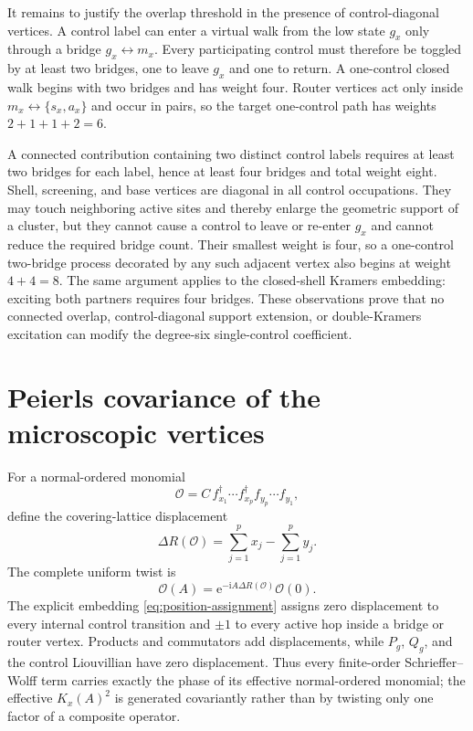 \documentclass[11pt]{article}
\theoremstyle{definition}
\theoremstyle{remark}
\newcommand{\I}{\mathrm i}
\newcommand{\e}{\mathrm e}
\begin{document}
It remains to justify the overlap threshold in the presence of control-diagonal vertices.  A control label can enter a virtual walk from the low state $g_x$ only through a bridge $g_x\leftrightarrow m_x$.  Every participating control must therefore be toggled by at least two bridges, one to leave $g_x$ and one to return.  A one-control closed walk begins with two bridges and has weight four.  Router vertices act only inside $m_x\leftrightarrow\{s_x,a_x\}$ and occur in pairs, so the target one-control path has weights $2+1+1+2=6$.

A connected contribution containing two distinct control labels requires at least two bridges for each label, hence at least four bridges and total weight eight.  Shell, screening, and base vertices are diagonal in all control occupations.  They may touch neighboring active sites and thereby enlarge the geometric support of a cluster, but they cannot cause a control to leave or re-enter $g_x$ and cannot reduce the required bridge count.  Their smallest weight is four, so a one-control two-bridge process decorated by any such adjacent vertex also begins at weight $4+4=8$.  The same argument applies to the closed-shell Kramers embedding: exciting both partners requires four bridges.  These observations prove that no connected overlap, control-diagonal support extension, or double-Kramers excitation can modify the degree-six single-control coefficient.

\section{Peierls covariance of the microscopic vertices}
\label{app:peierls}

For a normal-ordered monomial
\begin{equation}
 \mathcal O=C\,f_{x_1}^\dagger\cdots f_{x_p}^\dagger f_{y_p}\cdots f_{y_1},
\end{equation}
define the covering-lattice displacement
\begin{equation}
 \Delta R(\mathcal O)=\sum_{j=1}^px_j-\sum_{j=1}^py_j.
\end{equation}
The complete uniform twist is
\begin{equation}
 \mathcal O(A)=\e^{-\I A\Delta R(\mathcal O)}\mathcal O(0).
\end{equation}
The explicit embedding \eqref{eq:position-assignment} assigns zero displacement to every internal control transition and $\pm1$ to every active hop inside a bridge or router vertex.  Products and commutators add displacements, while $P_g$, $Q_g$, and the control Liouvillian have zero displacement.  Thus every finite-order Schrieffer--Wolff term carries exactly the phase of its effective normal-ordered monomial; the effective $K_x(A)^2$ is generated covariantly rather than by twisting only one factor of a composite operator.
\end{document}
